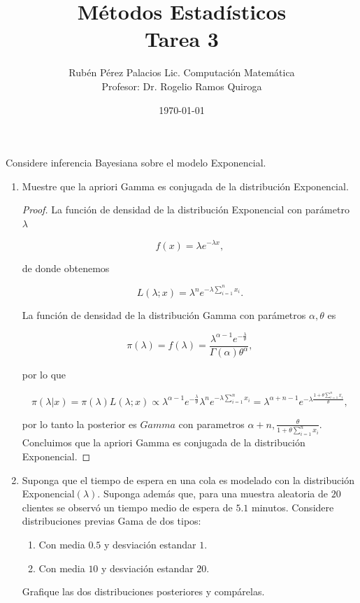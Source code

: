 \documentclass[letterpaper]{article}
\title{Métodos Estadísticos \\ Tarea 3}
\author{Rubén Pérez Palacios Lic. Computación Matemática\\Profesor: Dr. Rogelio Ramos Quiroga}
\date{\today}
\theoremstyle{definition}
\theoremstyle{lemathm}
\theoremstyle{lemathm}
\theoremstyle{lemathm}
\theoremstyle{lemademthm}
\newcommand{\pars}[1]{\left( #1 \right) }
\newcommand{\1}{\mathbbm{1}}
\begin{document}
	\maketitle
	
	Considere inferencia Bayesiana sobre el modelo Exponencial.

	\begin{enumerate}
		\item Muestre que la apriori Gamma es conjugada de la distribución Exponencial.
		
		\begin{proof}

			La función de densidad de la distribución Exponencial con parámetro $\lambda$

			\[f(x) = \lambda e^{-\lambda x},\]

			de donde obtenemos 

			\[L\pars{\lambda; x} = \lambda^n e^{-\lambda \sum_{i=1}^{n} x_i}.\]

			La función de densidad de la distribución Gamma con parámetros $\alpha, \theta$ es

			\[\pi\pars{\lambda} = f\pars{\lambda} = \frac{\lambda^{\alpha-1}e^{-\frac{\lambda}{\theta}}}{\Gamma\pars{\alpha}\theta^{\alpha}},\]

			por lo que

			\[\pi\pars{\lambda|x} = \pi(\lambda) L\pars{\lambda; x} \propto \lambda^{\alpha-1}e^{-\frac{\lambda}{\theta}} \lambda^n e^{-\lambda \sum_{i=1}^{n} x_i} = \lambda^{\alpha+n-1}e^{-\lambda\frac{1+\theta\sum_{i=1}^n x_i}{\theta}},\]

			por lo tanto la posterior es $Gamma$ con parametros $\alpha+n, \frac{\theta}{1+\theta\sum_{i=1}^n x_i}$. Concluimos que la apriori Gamma es conjugada de la distribución Exponencial.
		\end{proof}

		\newpage

		\item Suponga que el tiempo de espera en una cola es modelado con la distribución Exponencial$\pars{\lambda}$. Suponga además que, para una muestra aleatoria de $20$ clientes se observó un tiempo medio de espera de $5.1$ minutos. Considere distribuciones previas Gama de dos tipos:
		\begin{enumerate}
			\item Con media $0.5$ y desviación estandar $1$.
			\item Con media $10$ y desviación estandar $20$.
		\end{enumerate}
		Grafique las dos distribuciones posteriores y compárelas.


\end{enumerate}
\end{document}
